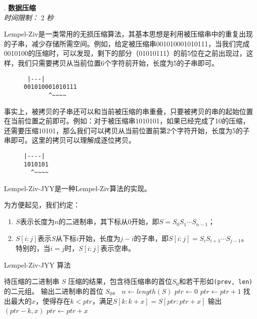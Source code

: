 \addtocounter{ProblemNo}{1}
\renewcommand{\ProblemName}{数据压缩}
\begin{center}
\huge{. \textbf{\ProblemName}} \\ [0.8cm]
\large{\textit{时间限制：} 2 \textit{秒}} \\ [1cm]
\end{center}

Lempel-Ziv是一类常用的无损压缩算法，其基本思想是利用被压缩串中的重复出现的子串，减少存储所需空间。例如，给定被压缩串001010001010111，当我们完成0010100的压缩时，可以发现，剩下的部分（01010111）的前5位在之前出现过，这样，我们只需要拷贝从当前位置6个字符前开始，长度为5的子串即可。

\begin{figure}[h]
\centering
\begin{BVerbatim}
 |---| 
001010001010111
       ^~~~~
\end{BVerbatim}
\end{figure}

事实上，被拷贝的子串还可以和当前被压缩的串重叠，只要被拷贝的串的起始位置在当前位置之前即可。例如：对于被压缩串1010101，如果已经完成了10的压缩，还需要压缩10101，那么我们可以拷贝从当前位置前第2个字符开始，长度为5的子串即可。这里的拷贝可以理解成逐位拷贝。

\begin{figure}[h]
\centering
\begin{BVerbatim}
|----|
1010101
  ^~~~~
\end{BVerbatim}
\end{figure}

Lempel-Ziv-JYY是一种Lempel-Ziv算法的实现。

为方便起见，我们约定：
\begin{enumerate}
    \item $S$表示长度为$n$的二进制串，其下标从0开始，即$S = S_0 S_1 \cdots S_{n-1}$；
    \item $S[i:j]$表示$S$从下标$i$开始，长度为$j-i$的子串，即$S[i:j] = S_iS_{i+1} \cdots S_{j-1}$。特别的，当$i = j$时，$S[i:j]$表示空串。
\end{enumerate}

\begin{algorithm}
\caption{Lempel-Ziv-JYY 算法}
\begin{algorithmic}[1]
    \Require 待压缩的二进制串 $S$
    \Ensure 压缩的结果，包含待压缩串的首位$S_0$和若干形如\texttt{(prev, len)}的二元组。
    \State 输出二进制串的首位 $S_0$。
    \State $n \leftarrow \mathit{length}(S)$
    \State $\mathit{ptr} \leftarrow 0$
    \Repeat
        \State $\mathit{ptr} \leftarrow \mathit{ptr} + 1$
        \State 找出最大的$x$，使得存在$k < \mathit{ptr}$，满足$S[k:k+x] = S[\mathit{ptr}:\mathit{ptr}+x]$
        \State 输出$(\mathit{ptr} - k, x)$
        \State $\mathit{ptr} \leftarrow \mathit{ptr} + x$
\end{algorithmic}
\end{algorithm}

